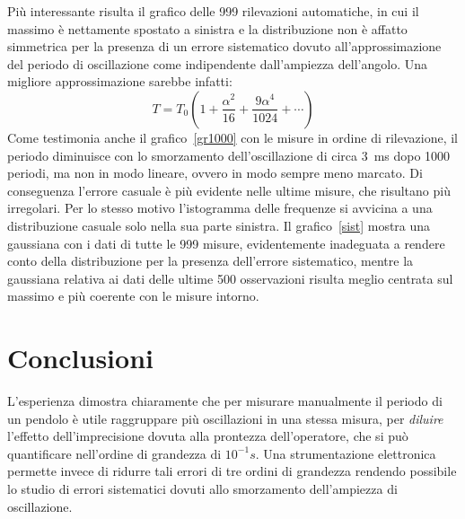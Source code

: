 \documentclass[italian,a4paper,10pt]{article}
\theoremstyle{definition}
\begin{document}
Più interessante risulta il grafico delle 999 rilevazioni automatiche, in cui il massimo è nettamente spostato a sinistra e la distribuzione non è affatto simmetrica per la presenza di un errore sistematico dovuto all'approssimazione del periodo di oscillazione come indipendente dall'ampiezza dell'angolo. Una migliore approssimazione sarebbe infatti:
\begin{equation*}
 T = T_0\left(1+\dfrac{\alpha^2}{16}+\dfrac{9\alpha^4}{1024}+\cdots\right)
\end{equation*}
Come testimonia anche il grafico~\ref{gr1000} con le misure in ordine di rilevazione, il periodo diminuisce con lo smorzamento dell'oscillazione di circa 3~ms dopo 1000 periodi, ma non in modo lineare, ovvero in modo sempre meno marcato. Di conseguenza l'errore casuale è più evidente nelle ultime misure, che risultano più irregolari. Per lo stesso motivo l'istogramma delle frequenze si avvicina a una distribuzione casuale solo nella sua parte sinistra. Il grafico~\ref{sist} mostra una gaussiana con i dati di tutte le 999 misure, evidentemente inadeguata a rendere conto della distribuzione per la presenza dell'errore sistematico, mentre la gaussiana relativa ai dati delle ultime 500 osservazioni risulta meglio centrata sul massimo e più coerente con le misure intorno.
\section{Conclusioni}
L'esperienza dimostra chiaramente che per misurare manualmente il periodo di un pendolo è utile raggruppare più oscillazioni in una stessa misura, per \emph{diluire} l'effetto dell'imprecisione dovuta alla prontezza dell'operatore, che si può quantificare nell'ordine di grandezza di $10^{-1} s$. Una strumentazione elettronica permette invece di ridurre tali errori di tre ordini di grandezza rendendo possibile lo studio di errori sistematici dovuti allo smorzamento dell'ampiezza di oscillazione.
\end{document}
